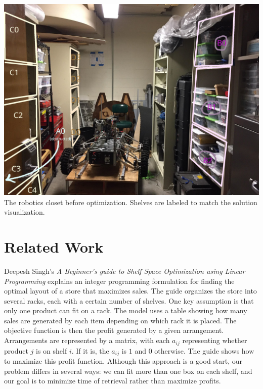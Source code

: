 \documentclass[10pt]{article}
\theoremstyle{named}
\begin{document}
\begin{center}
  \includegraphics[scale=0.7]{closet2.png} \\
  The robotics closet before optimization. Shelves are labeled to match the solution visualization.
\end{center}

\section{Related Work}
Deepesh Singh's \emph{A Beginner’s guide to Shelf Space Optimization using Linear Programming}
\cite{india} explains an integer programming formulation for finding the optimal layout
of a store that maximizes sales. The guide organizes the store into several racks, each
with a certain number of shelves. One key assumption is that only one product can fit
on a rack. The model uses a table showing how many sales are generated by each item
depending on which rack it is placed. The objective function is then the profit
generated by a given arrangement. Arrangements are represented by a matrix, with
each $a_{ij}$ representing whether product $j$ is on shelf $i$. If it is, the
$a_{ij}$ is $1$ and $0$ otherwise. The guide shows how to maximize this profit function.
Although this approach is a good start, our problem differs in several ways: we can
fit more than one box on each shelf, and our goal is to minimize time of retrieval
rather than maximize profits.

\end{document}
